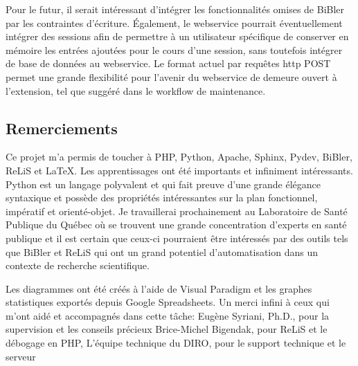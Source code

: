 \documentclass[12pt,titlepage]{article}
\begin{document}
Pour le futur, il serait intéressant d'intégrer les fonctionnalités omises de BiBler par les contraintes d'écriture. Également, le webservice pourrait éventuellement intégrer des sessions afin de permettre à un utilisateur spécifique de conserver en mémoire les entrées ajoutées pour le cours d'une session, sans toutefois intégrer de base de données au webservice. Le format actuel par requêtes http POST permet une grande flexibilité pour l'avenir du webservice de demeure ouvert à l'extension, tel que suggéré dans le workflow de maintenance.

\subsection{Remerciements}

Ce projet m'a permis de toucher à PHP, Python, Apache, Sphinx, Pydev, BiBler, ReLiS et LaTeX. Les apprentissages ont été importants et infiniment intéressants. Python est un langage polyvalent et qui fait preuve d'une grande élégance syntaxique et possède des propriétés intéressantes sur la plan fonctionnel, impératif et orienté-objet. Je travaillerai prochainement au Laboratoire de Santé Publique du Québec où se trouvent une grande concentration d'experts en santé publique et il est certain que ceux-ci pourraient être intéressés par des outils tels que BiBler et ReLiS qui ont un grand potentiel d'automatisation dans un contexte de recherche scientifique.

Les diagrammes ont été créés à l'aide de Visual Paradigm et les graphes statistiques exportés depuis Google Spreadsheets.\newline
Un merci infini à ceux qui m'ont aidé et accompagnés dans cette tâche: \newline
Eugène Syriani, Ph.D., pour la supervision et les conseils précieux\newline
Brice-Michel Bigendak, pour ReLiS et le débogage en PHP,
L'équipe technique du DIRO, pour le support technique et le serveur
{}
\listoffigures

\end{document}
